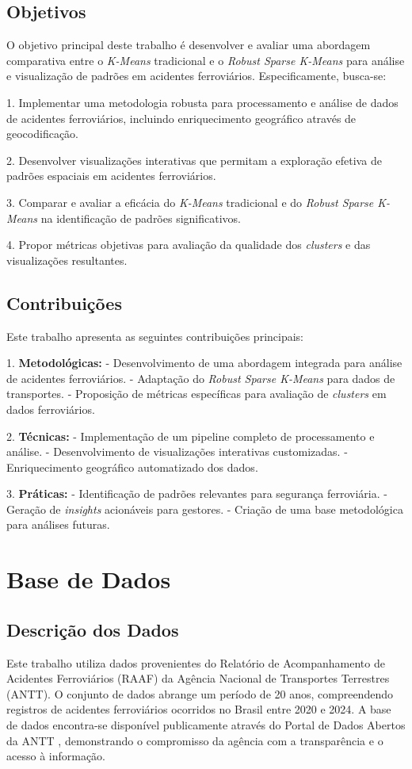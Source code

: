 \documentclass[conference]{IEEEtran}
\begin{document}
\subsection{Objetivos}
O objetivo principal deste trabalho é desenvolver e avaliar uma abordagem comparativa entre o \textit{K-Means} tradicional e o \textit{Robust Sparse K-Means} para análise e visualização de padrões em acidentes ferroviários. Especificamente, busca-se:

1. Implementar uma metodologia robusta para processamento e análise de dados de acidentes ferroviários, incluindo enriquecimento geográfico através de geocodificação.

2. Desenvolver visualizações interativas que permitam a exploração efetiva de padrões espaciais em acidentes ferroviários.

3. Comparar e avaliar a eficácia do \textit{K-Means} tradicional e do \textit{Robust Sparse K-Means} na identificação de padrões significativos.

4. Propor métricas objetivas para avaliação da qualidade dos \textit{clusters} e das visualizações resultantes.

\subsection{Contribuições}
Este trabalho apresenta as seguintes contribuições principais:

1. \textbf{Metodológicas:}
   - Desenvolvimento de uma abordagem integrada para análise de acidentes ferroviários.
   - Adaptação do \textit{Robust Sparse K-Means} para dados de transportes.
   - Proposição de métricas específicas para avaliação de \textit{clusters} em dados ferroviários.

2. \textbf{Técnicas:}
   - Implementação de um pipeline completo de processamento e análise.
   - Desenvolvimento de visualizações interativas customizadas.
   - Enriquecimento geográfico automatizado dos dados.

3. \textbf{Práticas:}
   - Identificação de padrões relevantes para segurança ferroviária.
   - Geração de \textit{insights} acionáveis para gestores.
   - Criação de uma base metodológica para análises futuras.

\section{Base de Dados}

\subsection{Descrição dos Dados}
Este trabalho utiliza dados provenientes do Relatório de Acompanhamento de Acidentes Ferroviários (RAAF) da Agência Nacional de Transportes Terrestres (ANTT). O conjunto de dados abrange um período de 20 anos, compreendendo registros de acidentes ferroviários ocorridos no Brasil entre 2020 e 2024. A base de dados encontra-se disponível publicamente através do Portal de Dados Abertos da ANTT \cite{b1}, demonstrando o compromisso da agência com a transparência e o acesso à informação.
\end{document}
